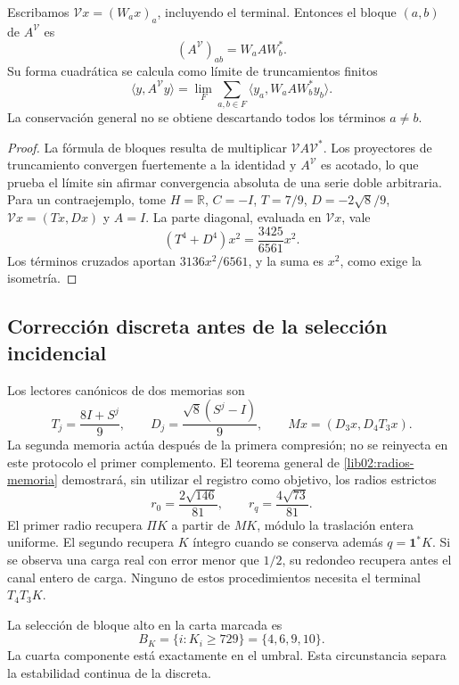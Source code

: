 \begin{proposition}
\label{lib01:correlaciones}
Escribamos \(\mathcal Vx=(W_ax)_a\), incluyendo el terminal. Entonces
el bloque \((a,b)\) de \(A^{\mathcal V}\) es
\[
 (A^{\mathcal V})_{ab}=W_aAW_b^*.
\]
Su forma cuadrática se calcula como límite de truncamientos finitos
\[
 \langle y,A^{\mathcal V}y\rangle
 =\lim_F\sum_{a,b\in F}\langle y_a,W_aAW_b^*y_b\rangle.
\]
La conservación general no se obtiene descartando todos los términos
\(a\ne b\).
\end{proposition}
\begin{proof}
La fórmula de bloques resulta de multiplicar \(\mathcal VA\mathcal V^*\).
Los proyectores de truncamiento convergen fuertemente a la identidad y
\(A^{\mathcal V}\) es acotado, lo que prueba el límite sin afirmar
convergencia absoluta de una serie doble arbitraria. Para un
contraejemplo, tome \(H=\mathbb R\), \(C=-I\),
\(T=7/9\), \(D=-2\sqrt8/9\), \(\mathcal Vx=(Tx,Dx)\) y
\(A=I\). La parte diagonal, evaluada en \(\mathcal Vx\), vale
\[
 (T^4+D^4)x^2=\frac{3425}{6561}x^2.
\]
Los términos cruzados aportan \(3136x^2/6561\), y la suma es
\(x^2\), como exige la isometría.
\end{proof}

\subsection{Corrección discreta antes de la selección incidencial}
\label{lib01:correccion-incidencia}

Los lectores canónicos de dos memorias son
\[
 T_j=\frac{8I+S^j}{9},\qquad
 D_j=\frac{\sqrt8(S^j-I)}9,\qquad
 Mx=(D_3x,D_4T_3x).
\]
La segunda memoria actúa después de la primera compresión; no se reinyecta
en este protocolo el primer complemento. El teorema general de
\cref{lib02:radios-memoria} demostrará, sin utilizar el registro como
objetivo, los radios estrictos
\[
 r_0=\frac{2\sqrt{146}}{81},\qquad
 r_q=\frac{4\sqrt{73}}{81}.
\]
El primer radio recupera \(\Pi K\) a partir de \(MK\), módulo la
traslación entera uniforme. El segundo recupera \(K\) íntegro cuando
se conserva además \(q=\mathbf1^*K\). Si se observa una carga real
con error menor que \(1/2\), su redondeo recupera antes el canal entero
de carga. Ninguno de estos procedimientos necesita el terminal
\(T_4T_3K\).

La selección de bloque alto en la carta marcada es
\begin{equation}
 B_K=\{i:K_i\geq729\}=\{4,6,9,10\}.
 \label{lib01:umbral}
\end{equation}
La cuarta componente está exactamente en el umbral. Esta circunstancia
separa la estabilidad continua de la discreta.


